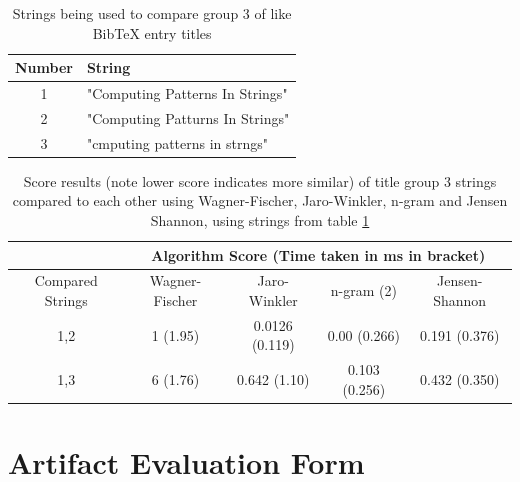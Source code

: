 \documentclass[a4paper,11pt]{article}
\begin{document}
\begin{table}[H]
      \centering
      \begin{tabular}{|c|p{}|}
      \hline
           Number &  String \\ \hline \hline
           1 & "Computing Patterns In Strings" \\ \hline
           2 & "Computing Patturns In Strings" \\ \hline
           3 & "cmputing patterns in strngs" \\ \hline
      \end{tabular}
  \caption{Strings being used to compare group 3 of like BibTeX entry titles}
\label{table:titleGroup3Strings}
\end{table}
    \begin{table}[H]
    \centering
       \begin{tabular}{|c|c|c|c|c|}
    \hline
     & \multicolumn{4}{c|}{Algorithm Score (Time taken in ms in bracket)}\\
     \hline
     Compared Strings  & Wagner-Fischer & Jaro-Winkler & n-gram (2) & Jensen-Shannon \\
     \hline \hline
    1,2 & 1 (1.95) &
0.0126 (0.119) &
0.00 (0.266) &
0.191 (0.376) \\
             \hline
    1,3 & 6 (1.76) &
0.642 (1.10) &
0.103 (0.256) &
0.432 (0.350) \\
    \hline
    \end{tabular}
    \caption{Score results (note lower score indicates more similar) of title group 3 strings compared to each other using Wagner-Fischer, Jaro-Winkler, n-gram and Jensen Shannon, using strings from table \ref{table:titleGroup3Strings}}
\label{table:algComparisonResultsTitle3}
\end{table}

\section{Artifact Evaluation Form}

\end{document}
